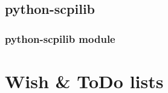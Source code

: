 \documentclass{beamer}
\begin{document}

\subsection{python-scpilib}

\begin{frame}
  \frametitle{python-scpilib module}
\end{frame}

\section{Wish \& ToDo lists}
\end{document}
